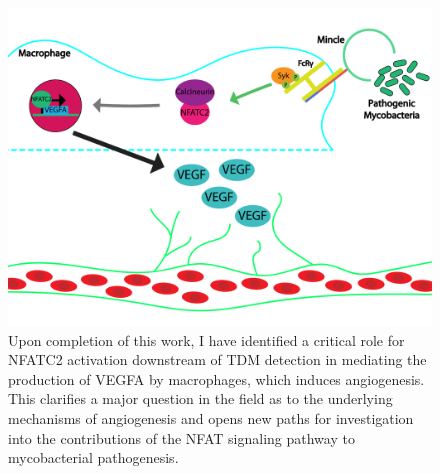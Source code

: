 \begin{figure}
\centering
\includegraphics[width=\textwidth]{images/conclusion_schematic.pdf}
\caption[Summary figure]{Upon completion of this work, I have identified a critical role for NFATC2 activation downstream of TDM detection in mediating the production of VEGFA by macrophages, which induces angiogenesis. This clarifies a major question in the field as to the underlying mechanisms of angiogenesis and opens new paths for investigation into the contributions of the NFAT signaling pathway to mycobacterial pathogenesis.}
\label{figure:endschematic}
\end{figure}

